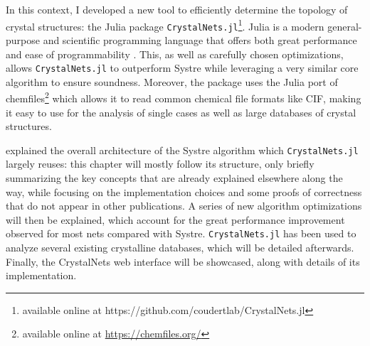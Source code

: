 \documentclass[main.tex]{subfiles}
\begin{document}

\medskip

In this context, I developed a new tool to efficiently determine the topology of crystal structures: the Julia package \texttt{CrystalNets.jl}\footnote{available online at https://github.com/coudertlab/CrystalNets.jl}. Julia \autocite{Julia} is a modern general-purpose and scientific programming language that offers both great performance and ease of programmability \autocite{JuliaDesign}. This, as well as carefully chosen optimizations, allows \texttt{CrystalNets.jl} to outperform Systre while leveraging a very similar core algorithm to ensure soundness. Moreover, the package uses the Julia port of chemfiles\footnote{available online at \url{https://chemfiles.org/}} which allows it to read common chemical file formats like CIF, making it easy to use for the analysis of single cases as well as large databases of crystal structures.

\textcite{Systre} explained the overall architecture of the Systre algorithm which \texttt{CrystalNets.jl} largely reuses: this chapter will mostly follow its structure, only briefly summarizing the key concepts that are already explained elsewhere along the way, while focusing on the implementation choices and some proofs of correctness that do not appear in other publications. A series of new algorithm optimizations will then be explained, which account for the great performance improvement observed for most nets compared with Systre. \texttt{CrystalNets.jl} has been used to analyze several existing crystalline databases, which will be detailed afterwards. Finally, the CrystalNets web interface will be showcased, along with details of its implementation.
\end{document}
